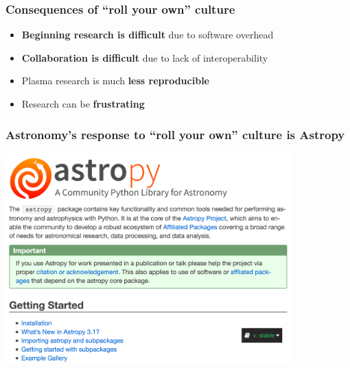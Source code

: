 \documentclass[default,compress]{beamer}
\begin{document}
\begin{frame}[plain]
    \frametitle{Consequences of ``roll your own'' culture}
    \begin{itemize}
    \item \textbf{Beginning research is difficult} due to software overhead
    \item \textbf{Collaboration is difficult} due to lack of interoperability
    \item Plasma research is much \textbf{less reproducible}
    \item Research can be \textbf{frustrating}
    \end{itemize}
        \vspace{3mm}
    \begin{center}
    \end{center}

\end{frame}


\begin{frame}[plain]

    \frametitle{Astronomy's response to ``roll your own'' culture is Astropy}
    \begin{center}
        \includegraphics[width=11.0cm]{AstropyDocsHeader.png}
    \end{center}

\end{frame}
\end{document}
